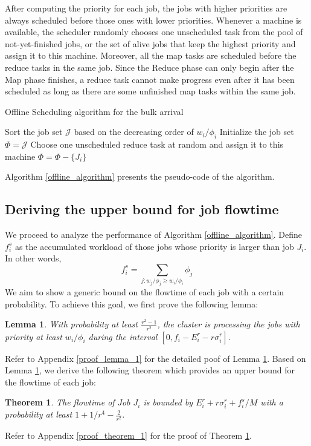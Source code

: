 \documentclass[10pt,conference,compsocconf,letterpaper]{IEEEtran}
\newtheorem{Theorem}{Theorem}
\newtheorem{lemma}{Lemma}
\begin{document}
After computing the priority for each job,  the jobs with higher priorities are always scheduled before those ones with lower priorities. Whenever a machine is available, the scheduler randomly chooses one unscheduled task from the pool of not-yet-finished jobs, or the set of alive jobs that keep the highest priority and assign it to this machine. Moreover, all the map tasks are scheduled before the reduce tasks in the same job.
Since the Reduce phase can only begin after the Map phase finishes, a reduce task cannot make progress even after it has been scheduled as long as there are some unfinished map tasks within the same job.


\IncMargin{1em}
\begin{algorithm}
\label{offline_algorithm}
\caption{Offline Scheduling algorithm for the bulk arrival}
\Indm
{}
\Indp
Sort the job set $\mathcal{J}$ based on the decreasing order of $w_i/\phi_i$ \;
Initialize the job set $\Phi = \mathcal{J}$\;
{
{
{
Choose one unscheduled reduce task at random and assign it to this machine\;
}
{
$\Phi = \Phi - \{J_i\}$\;
}
}
}
\end{algorithm}
\DecMargin{1em}

Algorithm \ref{offline_algorithm} presents the pseudo-code of the algorithm.




\subsection{Deriving the upper bound for job flowtime}
We proceed to analyze the performance of Algorithm \ref{offline_algorithm}. Define $f^s_i$ as the accumulated workload of those jobs whose priority is larger than job $J_i$. In other words,
\begin{equation}
f_i^s = \sum_{j:w_j/\phi_j \geq w_i/\phi_i} \phi_j
\end{equation}
We aim to show a generic bound on the flowtime of each job with a certain probability. To achieve this goal, we first prove the following lemma:
\begin{lemma}
\label{Lemma_1}
With probability at least $\frac{r^2-1}{r^2}$, the cluster is processing the jobs with priority at least $w_i/\phi_i$ during the interval $[0,f_i-E^r_i - r\sigma^r_i].$
\end{lemma}
Refer to Appendix \ref{proof_lemma_1} for the detailed poof of Lemma \ref{Lemma_1}.
Based on Lemma \ref{Lemma_1}, we derive the following theorem which provides an upper bound for the flowtime of
each job:
\begin{Theorem}
\label{Theorem 1}
The flowtime of Job $J_i$ is bounded by $E^r_i + r \sigma^r_i + f_i^s/M$ with a probability at least $1 + 1/r^4 -\frac{2}{r^2}$.
\end{Theorem}
Refer to Appendix \ref{proof_theorem_1} for the proof of Theorem \ref{Theorem 1}.
\end{document}
